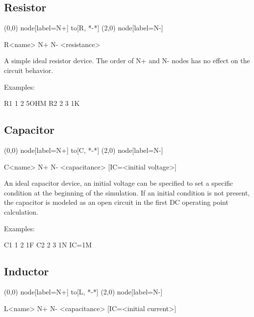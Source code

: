 \subsection{Resistor}

\begin{circuitdev}
	(0,0) node[label=N+]{} to[R, *-*] (2,0) node[label=N-]{}
\end{circuitdev}

\begin{code}
R<name> N+ N- <resistance>
\end{code}

A simple ideal resistor device. The order of N+ and N- nodes has no effect on the circuit behavior.

Examples: 

\begin{code}
R1 1 2 5OHM
R2 2 3 1K
\end{code}

\subsection{Capacitor}

\begin{circuitdev}
	(0,0) node[label=N+]{} to[C, *-*] (2,0) node[label=N-]{}
\end{circuitdev}

\begin{code}
C<name> N+ N- <capacitance> [IC=<initial voltage>]
\end{code}

An ideal capacitor device, an initial voltage can be specified to set a specific condition at the beginning of the simulation. If an initial condition is not present, the capacitor is modeled as an open circuit in the first DC operating point calculation.

Examples: 

\begin{code}
C1 1 2 1F
C2 2 3 1N IC=1M
\end{code}

\subsection{Inductor}

\begin{circuitdev}
	(0,0) node[label=N+]{} to[L, *-*] (2,0) node[label=N-]{}
\end{circuitdev}

\begin{code}
L<name> N+ N- <capacitance> [IC=<initial current>]
\end{code}

